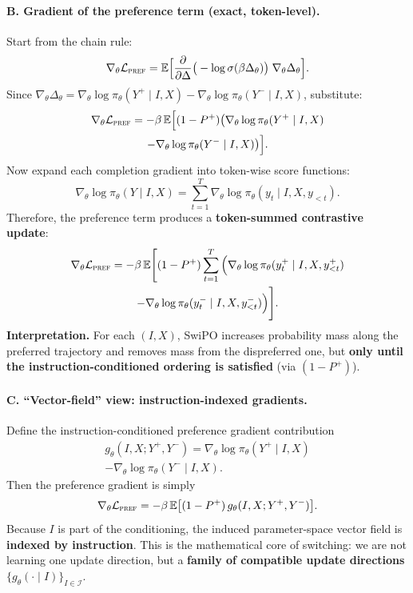 \paragraph{\textbf{B. Gradient of the preference term (exact, token-level).}}
Start from the chain rule:
\[
\nabla_\theta \mathcal{L}_{\textsc{pref}}
=
\mathbb{E}
\Big[
\frac{\partial}{\partial \Delta}\big(-\log \sigma(\beta\Delta_\theta)\big)\;
\nabla_\theta \Delta_\theta
\Big].
\]
Since $\nabla_\theta \Delta_\theta=\nabla_\theta\log\pi_\theta(Y^+\mid I,X)-\nabla_\theta\log\pi_\theta(Y^-\mid I,X)$, substitute:
{\small
\begin{multline*}
\nabla_\theta \mathcal{L}_{\textsc{pref}}
=
-\beta\,
\mathbb{E}
\Big[
(1-P^+)\big(
\nabla_\theta\log\pi_\theta(Y^+\mid I,X)\\
-\nabla_\theta\log\pi_\theta(Y^-\mid I,X)
\big)
\Big].
\end{multline*}
}
Now expand each completion gradient into token-wise score functions:
{\small
\[
\nabla_\theta\log\pi_\theta(Y\mid I,X)
=
\sum_{t=1}^{T}
\nabla_\theta\log\pi_\theta(y_t\mid I,X,y_{<t}).
\]
}
Therefore, the preference term produces a \textbf{token-summed contrastive update}:
{\small
\begin{multline*}
\nabla_\theta \mathcal{L}_{\textsc{pref}}
=
-\beta\,
\mathbb{E}
\Bigg[
(1-P^+)\sum_{t=1}^{T}
\Big(
\nabla_\theta\log\pi_\theta(y^+_t\mid I,X,y^+_{<t})
\\
-
\nabla_\theta\log\pi_\theta(y^-_t\mid I,X,y^-_{<t})
\Big)
\Bigg].
\end{multline*}
}
\textbf{Interpretation.} For each $(I,X)$, SwiPO increases probability mass along the preferred trajectory and removes mass from the dispreferred one, but \textbf{only until the instruction-conditioned ordering is satisfied} (via $(1-P^+)$).

\vspace{-0.35em}
\paragraph{\textbf{C. ``Vector-field'' view: instruction-indexed gradients.}}
Define the instruction-conditioned preference gradient contribution
\begin{multline*}
g_\theta(I,X;Y^+,Y^-)
=
\nabla_\theta\log\pi_\theta(Y^+\mid I,X)\\
-\nabla_\theta\log\pi_\theta(Y^-\mid I,X).
\end{multline*}
Then the preference gradient is simply
\[
\nabla_\theta \mathcal{L}_{\textsc{pref}}
=
-\beta\,\mathbb{E}\big[(1-P^+)\,g_\theta(I,X;Y^+,Y^-)\big].
\]
Because $I$ is part of the conditioning, the induced parameter-space vector field is \textbf{indexed by instruction}.
This is the mathematical core of switching: we are not learning one update direction, but a \textbf{family of compatible update directions} $\{g_\theta(\cdot\mid I)\}_{I\in\mathcal{I}}$.

